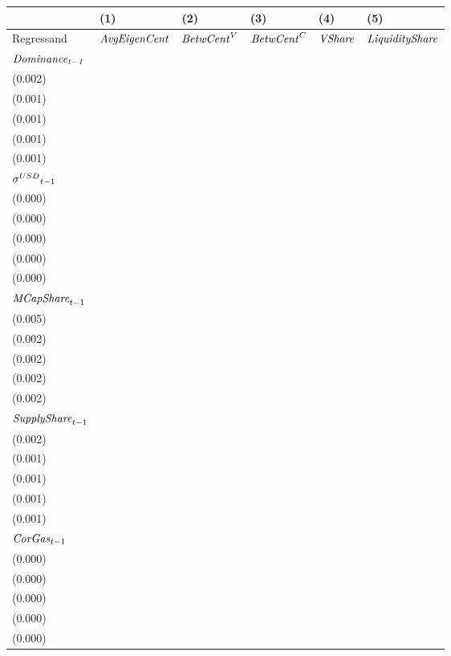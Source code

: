 \begin{tabular}{llllll}
\toprule
{} &                                   (1) &                                   (2) &                                   (3) &                                  (4) &                                   (5) \\
\midrule
Regressand                   &                  ${\it AvgEigenCent}$ &                    ${\it BetwCent}^V$ &                    ${\it BetwCent}^C$ &                       ${\it VShare}$ &                ${\it LiquidityShare}$ \\
$\it Dominance_{t-1}$        &   \makecell{$0.833^{***}$ \\ (0.002)} &   \makecell{$0.965^{***}$ \\ (0.001)} &   \makecell{$0.958^{***}$ \\ (0.001)} &  \makecell{$0.900^{***}$ \\ (0.001)} &   \makecell{$0.896^{***}$ \\ (0.001)} \\
${{\it \sigma}^{USD}}_{t-1}$ &      \makecell{$0.000^{}$ \\ (0.000)} &      \makecell{$0.000^{}$ \\ (0.000)} &      \makecell{$0.000^{}$ \\ (0.000)} &     \makecell{$0.000^{}$ \\ (0.000)} &      \makecell{$0.000^{}$ \\ (0.000)} \\
${{\it MCapShare}}_{t-1}$    &   \makecell{$0.034^{***}$ \\ (0.005)} &   \makecell{$0.056^{***}$ \\ (0.002)} &   \makecell{$0.045^{***}$ \\ (0.002)} &  \makecell{$0.047^{***}$ \\ (0.002)} &   \makecell{$0.059^{***}$ \\ (0.002)} \\
${{\it SupplyShare}}_{t-1}$  &   \makecell{$0.035^{***}$ \\ (0.002)} &   \makecell{$0.008^{***}$ \\ (0.001)} &   \makecell{$0.004^{***}$ \\ (0.001)} &  \makecell{$0.013^{***}$ \\ (0.001)} &   \makecell{$0.003^{***}$ \\ (0.001)} \\
${{\it CorGas}}_{t-1}$       &      \makecell{$0.000^{}$ \\ (0.000)} &     \makecell{$-0.000^{}$ \\ (0.000)} &      \makecell{$0.000^{}$ \\ (0.000)} &     \makecell{$0.000^{}$ \\ (0.000)} &      \makecell{$0.000^{}$ \\ (0.000)} \\

\end{tabular}
